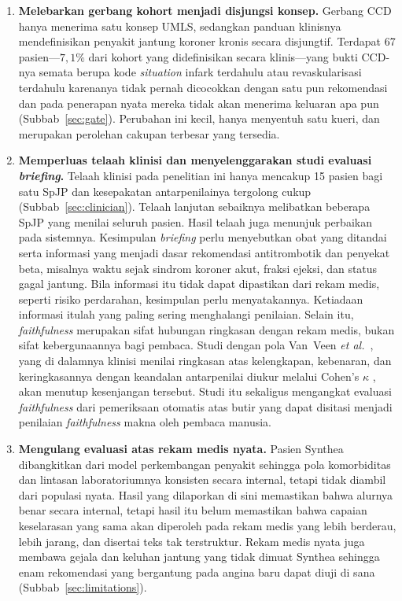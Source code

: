 \begin{enumerate}
    \item \textbf{Melebarkan gerbang kohort menjadi disjungsi konsep.} Gerbang CCD hanya
    menerima satu konsep UMLS, sedangkan panduan klinisnya mendefinisikan penyakit jantung koroner
    kronis secara disjungtif. Terdapat 67 pasien---$7{,}1\%$ dari kohort
    yang didefinisikan secara klinis---yang bukti CCD-nya semata berupa kode
    \emph{situation} infark terdahulu atau revaskularisasi terdahulu karenanya tidak pernah
    dicocokkan dengan satu pun rekomendasi dan pada penerapan nyata mereka tidak akan
    menerima keluaran apa pun (Subbab~\ref{sec:gate}). Perubahan ini kecil, hanya menyentuh
    satu kueri, dan merupakan perolehan cakupan terbesar yang tersedia.

    \item \textbf{Memperluas telaah klinisi dan menyelenggarakan studi evaluasi \emph{briefing}.}
    Telaah klinisi pada penelitian ini hanya mencakup 15 pasien bagi satu SpJP dan kesepakatan
    antarpenilainya tergolong cukup (Subbab~\ref{sec:clinician}). Telaah lanjutan sebaiknya
    melibatkan beberapa SpJP yang menilai seluruh pasien. Hasil telaah juga menunjuk perbaikan
    pada sistemnya. Kesimpulan \emph{briefing} perlu menyebutkan obat yang ditandai serta
    informasi yang menjadi dasar rekomendasi antitrombotik dan penyekat beta, misalnya waktu
    sejak sindrom koroner akut, fraksi ejeksi, dan status gagal jantung. Bila informasi itu
    tidak dapat dipastikan dari rekam medis, seperti risiko perdarahan, kesimpulan perlu
    menyatakannya. Ketiadaan informasi itulah yang paling sering menghalangi penilaian. Selain itu,
    \emph{faithfulness} merupakan sifat hubungan ringkasan dengan rekam medis, bukan sifat
    kebergunaannya bagi pembaca. Studi dengan pola Van~Veen \textit{et al.}~\cite{vanveen2023},
    yang di dalamnya klinisi menilai ringkasan atas kelengkapan, kebenaran, dan keringkasannya
    dengan keandalan antarpenilai diukur melalui Cohen's $\kappa$ \cite{cohen1960}, akan
    menutup kesenjangan tersebut. Studi itu sekaligus mengangkat evaluasi \emph{faithfulness}
    dari pemeriksaan otomatis atas butir yang dapat disitasi menjadi penilaian
    \emph{faithfulness} makna oleh pembaca manusia.

    \item \textbf{Mengulang evaluasi atas rekam medis nyata.} Pasien Synthea dibangkitkan
    dari model perkembangan penyakit sehingga pola komorbiditas dan lintasan
    laboratoriumnya konsisten secara internal, tetapi tidak diambil dari populasi nyata. Hasil
    yang dilaporkan di sini memastikan bahwa alurnya benar secara internal, tetapi hasil itu belum
    memastikan bahwa capaian keselarasan yang sama akan diperoleh pada rekam medis yang lebih
    berderau, lebih jarang, dan disertai teks tak terstruktur. Rekam medis nyata juga membawa
    gejala dan keluhan jantung yang tidak dimuat Synthea sehingga enam rekomendasi yang
    bergantung pada angina baru dapat diuji di sana (Subbab~\ref{sec:limitations}).


\end{enumerate}
